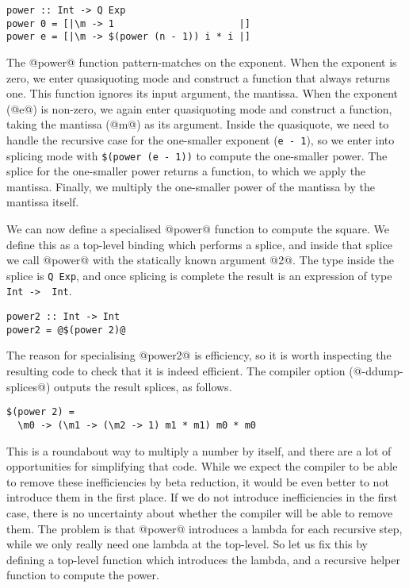 \begin{lstlisting}
power :: Int -> Q Exp
power 0 = [|\m -> 1                      |]
power e = [|\m -> $(power (n - 1)) i * i |]
\end{lstlisting}

The @power@ function pattern-matches on the exponent.
When the exponent is zero, we enter quasiquoting mode and construct a function that always returns one.
This function ignores its input argument, the mantissa.
When the exponent (@e@) is non-zero, we again enter quasiquoting mode and construct a function, taking the mantissa (@m@) as its argument.
Inside the quasiquote, we need to handle the recursive case for the one-smaller exponent (\lstinline/e - 1/), so we enter into splicing mode with \lstinline/$(power (e - 1))/ to compute the one-smaller power.
The splice for the one-smaller power returns a function, to which we apply the mantissa.
Finally, we multiply the one-smaller power of the mantissa by the mantissa itself.

We can now define a specialised @power@ function to compute the square.
We define this as a top-level binding which performs a splice, and inside that splice we call @power@ with the statically known argument @2@.
The type inside the splice is \lstinline/Q Exp/, and once splicing is complete the result is an expression of type \lstinline/Int ->  Int/.

\begin{lstlisting}
power2 :: Int -> Int
power2 = @$(power 2)@
\end{lstlisting}


The reason for specialising @power2@ is efficiency, so it is worth inspecting the resulting code to check that it is indeed efficient.
The compiler option (@-ddump-splices@) outputs the result splices, as follows.

\begin{lstlisting}
$(power 2) =
  \m0 -> (\m1 -> (\m2 -> 1) m1 * m1) m0 * m0
\end{lstlisting}

This is a roundabout way to multiply a number by itself, and there are a lot of opportunities for simplifying that code.
While we expect the compiler to be able to remove these inefficiencies by beta reduction, it would be even better to not introduce them in the first place.
If we do not introduce inefficiencies in the first case, there is no uncertainty about whether the compiler will be able to remove them.
The problem is that @power@ introduces a lambda for each recursive step, while we only really need one lambda at the top-level.
So let us fix this by defining a top-level function which introduces the lambda, and a recursive helper function to compute the power.

